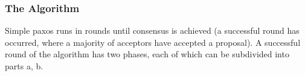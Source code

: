 
%

\subsubsection{The Algorithm}
Simple paxos runs in rounds until consensus is achieved (a successful round
has occurred, where a majority of acceptors have accepted a proposal).
A successful round of the algorithm has two phases, each of which can
be subdivided into parts a, b.

